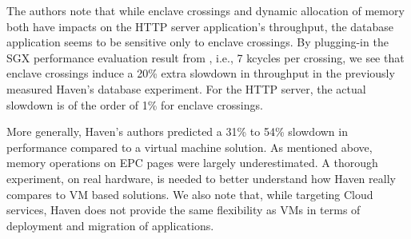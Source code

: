 The authors note that while enclave crossings and dynamic allocation of memory both have impacts on the HTTP server application's throughput, the database application seems to be sensitive only to enclave crossings.
By plugging-in the SGX performance evaluation result from \cite{DBLP:conf/IEEEwisa/ZhaoSTZX16}, i.e., 7 kcycles per crossing, we see that enclave crossings induce a 20\% extra slowdown in throughput in the previously measured Haven's database experiment.
For the HTTP server, the actual slowdown is of the order of 1\% for enclave crossings.

More generally, Haven's authors predicted a 31\% to 54\% slowdown in performance compared to a virtual machine solution.
As mentioned above, memory operations on EPC pages were largely underestimated.
A thorough experiment, on real hardware, is needed to better understand how Haven really compares to VM based solutions.
We also note that, while targeting Cloud services, Haven does not provide the same flexibility as VMs in terms of deployment and migration of applications.
